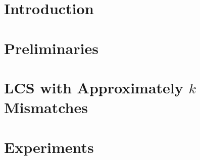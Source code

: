 \section{Introduction}\label{lcs:sec:intro}
	
\section{Preliminaries}\label{lcs:sec:prelim}

\section{LCS with Approximately \texorpdfstring{$k$}{k} Mismatches}\label{lcs:sec:klcs}


\section{Experiments}\label{lcs:sec:implem}

\BiblatexSplitbibDefernumbersWarningOff

\backmatter
\printbibliography[segment=\therefsegment,heading=subbibintoc]